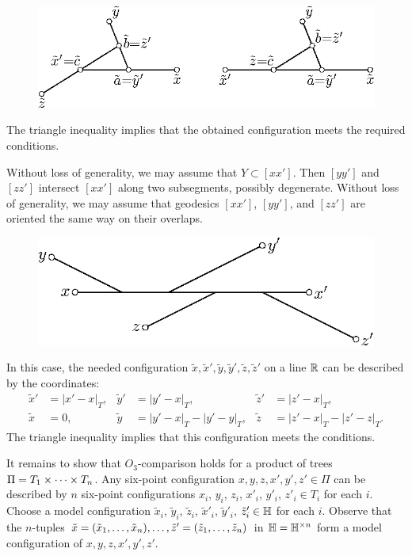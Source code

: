 \documentclass{article}
\begin{document}
\begin{figure}[ht!]
\centering
\includegraphics{mppics/pic-50}
\end{figure}

The triangle inequality implies that the obtained configuration meets the required conditions.

Without loss of generality, we may assume that $Y\subset [xx']$.
Then $[yy']$ and $[zz']$ intersect $[xx']$ along two subsegments, possibly degenerate.
Without loss of generality, we may assume that geodesics $[xx']$, $[yy']$, and $[zz']$ are oriented the same way on their overlaps.

\begin{figure}[ht!]
\centering
\includegraphics{mppics/pic-60}
\end{figure}

In this case, the needed configuration $\tilde x,\tilde x',\tilde y,\tilde y',\tilde z,\tilde z'$ on a line $\mathbb{R}$ can be described by the coordinates:
\begin{align*}
\tilde x'&=|x'-x|_T,
&
\tilde y'&=|y'-x|_T,
&
\tilde z'&=|z'-x|_T,
\\
\tilde x&=0,
&
\tilde y&=|y'-x|_T-|y'-y|_T,
&
\tilde z&=|z'-x|_T-|z'-z|_T.
\end{align*}
The triangle inequality implies that this configuration meets the conditions. 

It remains to show that $O_3$-comparison holds for a product of trees $\Pi\z=T_1\times \dots\times T_n$.
Any six-point configuration $x,y,z,x',y',z'\in \Pi$ can be described by $n$ six-point configurations $x_i$, $y_i$, $z_i$, $x'_i$, $y'_i$, $z'_i\in T_i$ for each $i$.
Choose a model configuration $\tilde x_i$, $\tilde y_i$, $\tilde z_i$, $\tilde x'_i$, $\tilde y'_i$, $\tilde z'_i\in \mathbb H$ for each $i$.
Observe that the $n$-tuples $\tilde x=(\tilde x_1,\dots, \tilde x_n),\z\dots,\tilde z'=(\tilde z_1,\dots, \tilde z_n)$ in $\mathbb H=\mathbb H^{\times n}$ form a model configuration of $x,y,z,x',y',z'$.
\qeds
\end{document}
